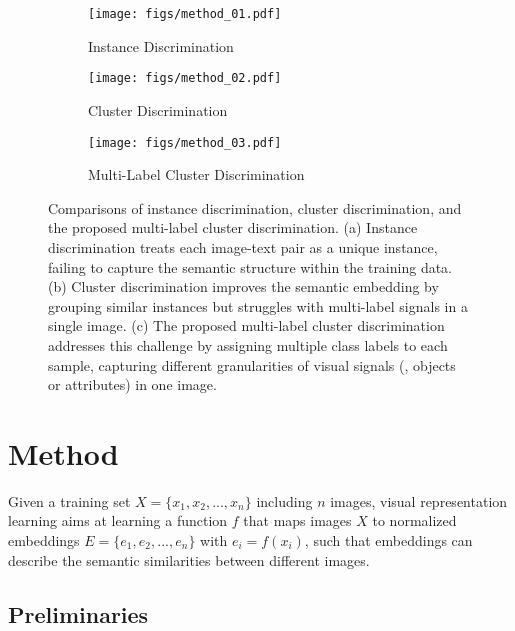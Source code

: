 \begin{figure}[t]
\centering
\begin{subfigure}{0.33\textwidth}
\texttt{[image: figs/method\_01.pdf]}
\captionsetup{justification=centering}
\caption{ Instance \linebreak  Discrimination}
\label{fig1:instance}
\end{subfigure}\hspace{-10pt}
\begin{subfigure}{0.33\textwidth}
\texttt{[image: figs/method\_02.pdf]}
\captionsetup{justification=centering}
\caption{ Cluster \linebreak Discrimination}
\label{fig1:cluster}
\end{subfigure}\hspace{-5pt}
\begin{subfigure}{0.33\textwidth}
\texttt{[image: figs/method\_03.pdf]}
\captionsetup{justification=centering}\caption{ Multi-Label \linebreak Cluster Discrimination}
\label{fig1:multicluster}
\end{subfigure}
\caption{Comparisons of instance discrimination, cluster discrimination, and the proposed multi-label cluster discrimination. (a) Instance discrimination treats each image-text pair as a unique instance, failing to capture the semantic structure within the training data. (b) Cluster discrimination improves the semantic embedding by grouping similar instances but struggles with multi-label signals in a single image. (c) The proposed multi-label cluster discrimination addresses this challenge by assigning multiple class labels to each sample, 
capturing different granularities of visual signals (\eg, objects or attributes) in one image.}
\label{fig1:main}
\vspace{-4mm}
\end{figure}

\section{Method}
Given a training set $X=\{x_1, x_2,...,x_n\}$ including $n$ images, visual representation learning aims at learning a function $f$ that maps images $X$ to normalized embeddings $E=\{e_1, e_2,...,e_n\}$ with $e_i=f(x_i)$, such that embeddings can describe the semantic similarities between different images. 

\subsection{Preliminaries}

